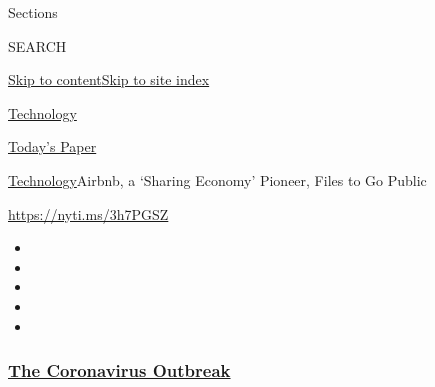 Sections

SEARCH

\protect\hyperlink{site-content}{Skip to
content}\protect\hyperlink{site-index}{Skip to site index}

\href{https://www.nytimes3xbfgragh.onion/section/technology}{Technology}

\href{https://myaccount.nytimes3xbfgragh.onion/auth/login?response_type=cookie\&client_id=vi}{}

\href{https://www.nytimes3xbfgragh.onion/section/todayspaper}{Today's
Paper}

\href{/section/technology}{Technology}\textbar{}Airbnb, a `Sharing
Economy' Pioneer, Files to Go Public

\url{https://nyti.ms/3h7PGSZ}

\begin{itemize}
\item
\item
\item
\item
\item
\end{itemize}

\hypertarget{the-coronavirus-outbreak}{%
\subsubsection{\texorpdfstring{\href{https://www.nytimes3xbfgragh.onion/news-event/coronavirus?name=styln-coronavirus-markets\&region=TOP_BANNER\&variant=undefined\&block=storyline_menu_recirc\&action=click\&pgtype=Article\&impression_id=fffd0600-e381-11ea-898b-95a22c820370}{The
Coronavirus
Outbreak}}{The Coronavirus Outbreak}}\label{the-coronavirus-outbreak}}

